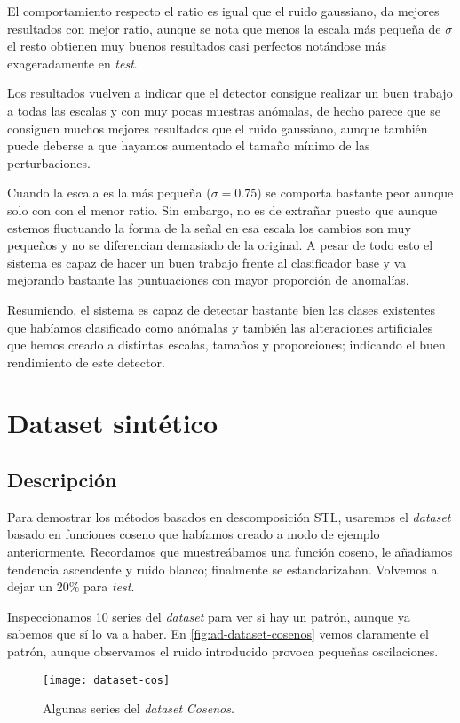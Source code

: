 El comportamiento respecto el ratio es igual que el ruido gaussiano, da mejores resultados con mejor ratio, aunque se nota que menos la escala más pequeña de $\sigma$ el resto obtienen muy buenos resultados casi perfectos notándose más exageradamente en \emph{test}.

Los resultados vuelven a indicar que el detector consigue realizar un buen trabajo a todas las escalas y con muy pocas muestras anómalas, de hecho parece que se consiguen muchos mejores resultados que el ruido gaussiano, aunque también puede deberse a que hayamos aumentado el tamaño mínimo de las perturbaciones.

Cuando la escala es la más pequeña ($\sigma = 0.75$) se comporta bastante peor aunque solo con con el menor ratio. Sin embargo, no es de extrañar puesto que aunque estemos fluctuando la forma de la señal en esa escala los cambios son muy pequeños y no se diferencian demasiado de la original. A pesar de todo esto el sistema es capaz de hacer un buen trabajo frente al clasificador base y va mejorando bastante las puntuaciones con mayor proporción de anomalías.

Resumiendo, el sistema es capaz de detectar bastante bien las clases existentes que habíamos clasificado como anómalas y también las alteraciones artificiales que hemos creado a distintas escalas, tamaños y proporciones; indicando el buen rendimiento de este detector.

\section{Dataset sintético}

\subsection{Descripción}

Para demostrar los métodos basados en descomposición STL, usaremos el \emph{dataset} basado en funciones coseno que habíamos creado a modo de ejemplo anteriormente. Recordamos que muestreábamos una función coseno, le añadíamos tendencia ascendente y ruido blanco; finalmente se estandarizaban. Volvemos a dejar un 20\% para \emph{test}.

Inspeccionamos 10 series del \emph{dataset}  para ver si hay un patrón, aunque ya sabemos que sí lo va a haber. En \autoref{fig:ad-dataset-cosenos} vemos claramente el patrón, aunque observamos el ruido introducido provoca pequeñas oscilaciones.

\begin{figure}[htpb]
  \centering
  \texttt{[image: dataset-cos]}
  \caption{Algunas series del \emph{dataset} \emph{Cosenos}.}
  \label{fig:ad-dataset-cosenos}
\end{figure}

